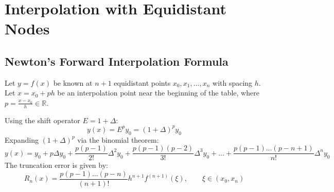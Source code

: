 \documentclass[11pt,a4paper]{article}
\begin{document}
\newpage

\section{Interpolation with Equidistant Nodes}

\subsection{Newton's Forward Interpolation Formula}
Let $y = f(x)$ be known at $n+1$ equidistant points $x_0, x_1, \dots, x_n$ with spacing $h$. Let $x = x_0 + p h$ be an interpolation point near the beginning of the table, where $p = \frac{x - x_0}{h} \in \mathbb{R}$.

Using the shift operator $E = 1 + \Delta$:
\begin{equation}
    y(x) = E^p y_0 = (1 + \Delta)^p y_0
\end{equation}
Expanding $(1 + \Delta)^p$ via the binomial theorem:
\begin{equation}
    \boxed{y(x) = y_0 + p \Delta y_0 + \frac{p(p-1)}{2!} \Delta^2 y_0 + \frac{p(p-1)(p-2)}{3!} \Delta^3 y_0 + \dots + \frac{p(p-1)\dots(p-n+1)}{n!} \Delta^n y_0}
\end{equation}
The truncation error is given by:
\begin{equation}
    R_n(x) = \frac{p(p-1)\dots(p-n)}{(n+1)!} h^{n+1} f^{(n+1)}(\xi), \qquad \xi \in (x_0, x_n)
\end{equation}
\end{document}
